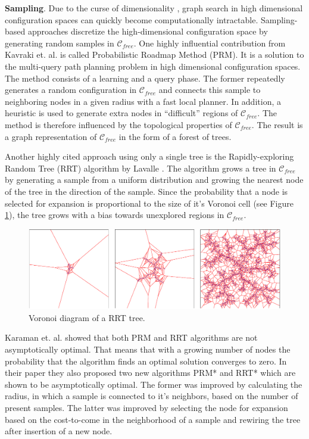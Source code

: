 \documentclass[]{article}
\begin{document}
\textbf{Sampling}. Due to the curse of dimensionality
\cite{bellmanDynamicProgramming1984}, graph search in high dimensional
configuration spaces can quickly become computationally intractable.
Sampling-based approaches discretize the high-dimensional
configuration space by generating random samples in
\(\mathcal{C}_{free}\). One highly influential contribution from
Kavraki et. al. \cite{kavrakiProbabilisticRoadmapsPath1996} is called
Probabilistic Roadmap Method (PRM). It is a solution to the
multi-query path planning problem in high dimensional configuration
spaces. The method consists of a learning and a query phase. The
former repeatedly generates a random configuration in
\(\mathcal{C}_{free}\) and connects this sample to neighboring nodes
in a given radius with a fast local planner. In addition, a heuristic
is used to generate extra nodes in ``difficult'' regions of
\(\mathcal{C}_{free}\). The method is therefore influenced by the
topological properties of \(\mathcal{C}_{free}\). The result is a
graph representation of \(\mathcal{C}_{free}\) in the form of a forest
of trees.

Another highly cited approach using only a single tree is the
Rapidly-exploring Random Tree (RRT) algorithm by Lavalle
\cite{lavalleRapidlyExploringRandomTrees1998}. The algorithm grows a
tree in \(\mathcal{C}_{free}\) by generating a sample from a uniform
distribution and growing the nearest node of the tree in the direction
of the sample. Since the probability that a node is selected for
expansion is proportional to the size of it's Voronoi cell (see Figure
\ref{fig:rrt}), the tree grows with a bias towards unexplored regions
in \(\mathcal{C}_{free}\).

\begin{figure}[h] \centering \includegraphics[scale=.275]{rrt_voronoi}
  \caption{Voronoi diagram of a RRT tree.}
  \label{fig:rrt}
\end{figure}

Karaman et. al. \cite{karamanSamplingbasedAlgorithmsOptimal2011}
showed that both PRM and RRT algorithms are not asymptotically
optimal. That means that with a growing number of nodes the
probability that the algorithm finds an optimal solution converges to
zero. In their paper they also proposed two new algorithms PRM* and
RRT* which are shown to be asymptotically optimal. The former was
improved by calculating the radius, in which a sample is connected to
it's neighbors, based on the number of present samples. The latter was
improved by selecting the node for expansion based on the cost-to-come
in the neighborhood of a sample and rewiring the tree after insertion
of a new node.
\end{document}
